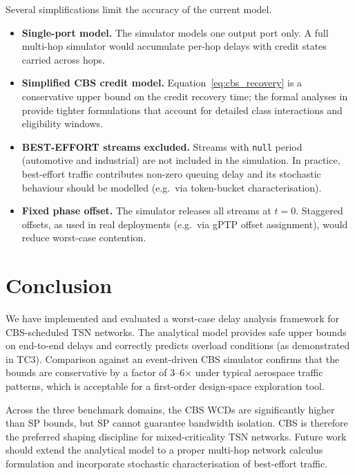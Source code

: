 Several simplifications limit the accuracy of the current model.

\begin{itemize}
    \item \textbf{Single-port model.} The simulator models one output port only. A full multi-hop simulator would accumulate per-hop delays with credit states carried across hops.
    \item \textbf{Simplified CBS credit model.} Equation~\ref{eq:cbs_recovery} is a conservative upper bound on the credit recovery time; the formal analyses in \cite{cao2016tight,cao2016independent,cao2018rts} provide tighter formulations that account for detailed class interactions and eligibility windows.
    \item \textbf{BEST-EFFORT streams excluded.} Streams with \texttt{null} period (automotive and industrial) are not included in the simulation. In practice, best-effort traffic contributes non-zero queuing delay and its stochastic behaviour should be modelled (e.g.\ via token-bucket characterisation).
    \item \textbf{Fixed phase offset.} The simulator releases all streams at $t=0$. Staggered offsets, as used in real deployments (e.g.\ via gPTP offset assignment), would reduce worst-case contention.
\end{itemize}

\section{Conclusion}
\label{sec:conclusion}

We have implemented and evaluated a worst-case delay analysis framework for CBS-scheduled TSN networks. The analytical model provides safe upper bounds on end-to-end delays and correctly predicts overload conditions (as demonstrated in TC3). Comparison against an event-driven CBS simulator confirms that the bounds are conservative by a factor of 3--6$\times$ under typical aerospace traffic patterns, which is acceptable for a first-order design-space exploration tool.

Across the three benchmark domains, the CBS WCDs are significantly higher than SP bounds, but SP cannot guarantee bandwidth isolation. CBS is therefore the preferred shaping discipline for mixed-criticality TSN networks. Future work should extend the analytical model to a proper multi-hop network calculus formulation and incorporate stochastic characterisation of best-effort traffic.
